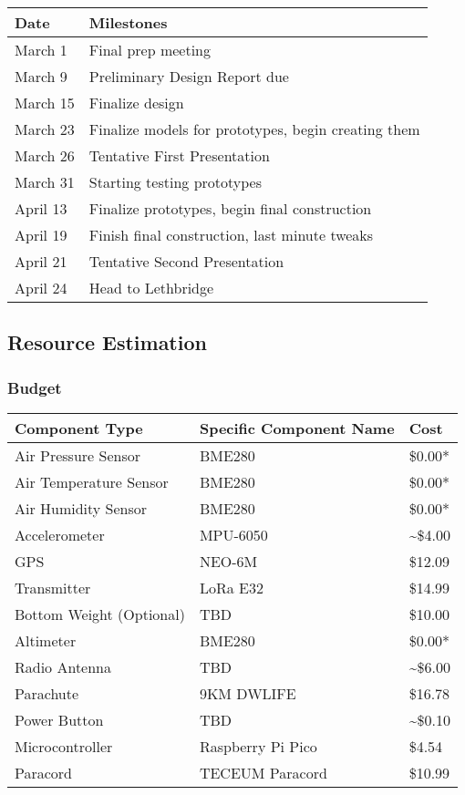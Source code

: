 \documentclass[10pt,twocolumn]{article}
\begin{document}
\begin{center}
\begin{tabular}{|p{2cm}|p{4cm}|}
\hline
\rowcolor{orange!30}
\textbf{Date} & \textbf{Milestones} \\
\hline
March 1 & Final prep meeting \\
March 9 & Preliminary Design Report due \\
March 15 & Finalize design \\
March 23 & Finalize models for prototypes, begin creating them \\
March 26 & Tentative First Presentation \\
March 31 & Starting testing prototypes \\
April 13 & Finalize prototypes, begin final construction \\
April 19 & Finish final construction, last minute tweaks \\
April 21 & Tentative Second Presentation \\
April 24 & Head to Lethbridge \\
\hline
\end{tabular}
\end{center}

\subsection{\textbf{Resource Estimation}}

\subsubsection{\textbf{Budget}}
\begin{center}
\begin{tabular}{|p{2cm}|p{2cm}|p{2cm}|}
\hline
\rowcolor{gray!30}
\textbf{Component Type} & \textbf{Specific Component Name} & \textbf{Cost} \\
\hline
Air Pressure Sensor & BME280 & \$0.00* \\
Air Temperature Sensor & BME280 & \$0.00* \\
Air Humidity Sensor & BME280 & \$0.00* \\
Accelerometer & MPU-6050 & \~{}\$4.00 \\
GPS & NEO-6M & \$12.09 \\
Transmitter & LoRa E32 & \$14.99 \\
Bottom Weight (Optional) & TBD & \$10.00 \\
Altimeter & BME280 & \$0.00* \\
Radio Antenna & TBD & \~{}\$6.00 \\
Parachute & 9KM DWLIFE & \$16.78 \\
Power Button & TBD & \~{}\$0.10 \\
Microcontroller & Raspberry Pi Pico & \$4.54 \\
Paracord & TECEUM Paracord & \$10.99 \\
\hline
\end{tabular}
\end{center}
\end{document}
